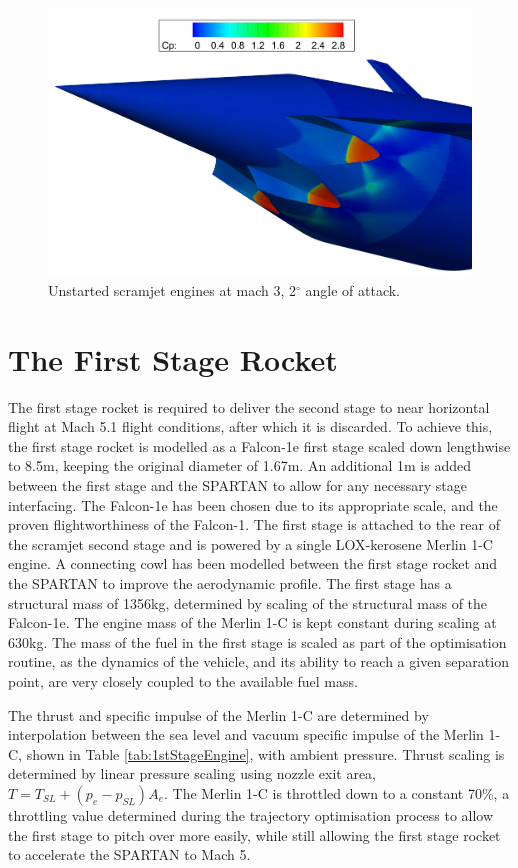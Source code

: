 \begin{figure}[ht]
	\centering
	\includegraphics[width=0.7\linewidth]{figures/3_vehicle_design/Unstart}
	\caption{Unstarted scramjet engines at mach 3, 2$^\circ$ angle of attack.}
	\label{fig:Unstart}
\end{figure}


\section{The First Stage Rocket}\label{sec:firststage}
The first stage rocket is required to deliver the second stage to near horizontal flight at Mach 5.1 flight conditions,
after which it is discarded. To achieve this, the first stage rocket is modelled as a Falcon-1e first stage scaled down
lengthwise to 8.5m, keeping the original diameter of 1.67m\cite{Vehicle2008}. An additional 1m is added between the first stage and the SPARTAN to allow for any necessary stage interfacing. 
The Falcon-1e has been chosen due to its appropriate scale, and the proven flightworthiness of the Falcon-1. 
 The first stage is attached to the rear of the scramjet
second stage and is powered by a single LOX-kerosene Merlin 1-C engine. A connecting cowl has been modelled between the first stage rocket and the SPARTAN to improve the aerodynamic profile.  The first stage has a structural mass of
1356kg, determined by scaling of the structural mass of the Falcon-1e. The engine mass of the Merlin 1-C is kept constant during scaling at 630kg\cite{Wade2017}. The mass of the
fuel in the first stage is scaled as part of the optimisation routine, as the dynamics of the vehicle, and its ability to reach a
given separation point, are very closely coupled to the available fuel mass.

The thrust and specific impulse of the Merlin 1-C are determined by interpolation between the sea level and vacuum specific impulse of the Merlin 1-C, shown in Table \ref{tab:1stStageEngine}, with ambient pressure. Thrust scaling is determined by linear pressure scaling using nozzle exit area, $T = T_{SL} + (p_e - p_{SL})A_e$. 
 The Merlin 1-C is throttled down to a constant 70\%, a throttling value determined during the trajectory optimisation process to allow the first stage to pitch over more easily, while still allowing the first stage rocket to accelerate the SPARTAN to Mach 5.

